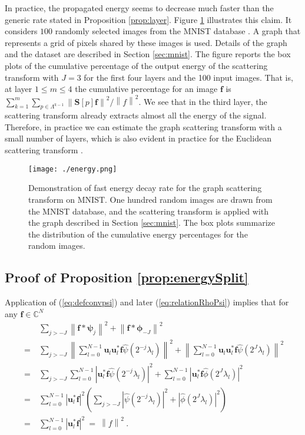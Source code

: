 \documentclass{article}
\def\l{\lambda}
\def\CC{\mathbb{C}}
\def\BS{\boldsymbol{S}}
\def\Bf{\boldsymbol{f}}
\def\Bu{\boldsymbol{u}}
\newcommand{\abs}[1]{\left| #1 \right|}
\newcommand{\norm}[1]{\left\lVert#1\right\rVert}
\begin{document}
In practice, the propagated energy seems to decrease much faster than the generic rate stated in Proposition \ref{prop:layer}. Figure \ref{fig:energy} illustrates this claim. It considers $100$ randomly selected images from the MNIST database \cite{LecB98}. A graph that represents a grid of pixels shared by these images is used. Details of the graph and the dataset are described in Section \ref{sec:mnist}.
The figure reports the box plots of the cumulative percentage of the output energy of the scattering transform with $J=3$ for the first four layers and the 100 input images. That is, at layer $1 \leq m \leq 4$ the cumulative percentage for an image $\Bf$ is $\sum_{k=1}^m \sum_{p \in \Lambda^{k-1}} \norm{\BS[p] \Bf}^2 / \norm{f}^2$. 
We see that in the third layer, the scattering transform already extracts almost all the energy of the signal. Therefore, in practice we can estimate the graph scattering transform with a small number of layers, which is also evident in practice for the Euclidean scattering transform \cite{BruM13}.
 
\begin{figure}[!ht]
    \centering
    \texttt{[image: ./energy.png]}
 	\caption{Demonstration of fast energy decay rate for the graph scattering transform on MNIST. One hundred random images are drawn from the MNIST database, and the scattering transform is applied with the graph described in  Section \ref{sec:mnist}. The box plots summarize the distribution of the cumulative energy percentages for the random images.}
    \label{fig:energy}
\end{figure}

\subsection{Proof of Proposition \ref{prop:energySplit}}
Application of (\ref{eq:defconvpsi}) and later (\ref{eq:relationRhoPsi}) implies that for any $\Bf \in \CC^N$
\begin{equation}\label{eq:fSingleSplit}
\begin{aligned}
~ & \sum_{j > -J} \norm{\Bf \ast \boldsymbol{\psi}_j}^2 + \norm{\Bf \ast \boldsymbol{\phi}_{-J}}^2 \\
~=~ & \sum_{j > -J} \norm{\sum_{l=0}^{N-1} \Bu_l \Bu_l^* \Bf \hat{\psi}(2^{-j} \l_l)}^2 + \norm{\sum_{l=0}^{N-1} \Bu_l \Bu_l^* \Bf \hat{\psi}(2^J \l_l)}^2 \\
~=~ & \sum_{j > -J} \sum_{l=0}^{N-1} \abs{\Bu_l^* \Bf \hat{\psi}(2^{-j}\l_l)}^2 + \sum_{l=0}^{N-1} \abs{\Bu_l^* \Bf \hat{\phi}(2^J \l_l)}^2 \\
~=~ & \sum_{l=0}^{N-1} \abs{\Bu_l^* \Bf}^2 \left( \sum_{j > -J} \abs{\hat{\psi}(2^{-j}\l_l)}^2 + \abs{\hat{\phi}(2^J \l_l)}^2 \right) \\
~=~ & \sum_{l=0}^{N-1} \abs{\Bu_l^* \Bf}^2 ~=~ \norm{f}^2 ~.
\end{aligned}
\end{equation}
\end{document}
